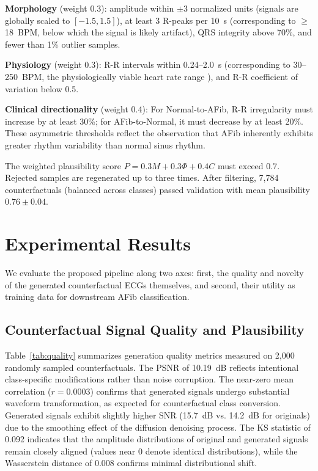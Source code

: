 \documentclass[conference]{IEEEtran}
\begin{document}
\textbf{Morphology} (weight 0.3): amplitude within $\pm 3$ normalized units (signals are globally scaled to $[-1.5, 1.5]$), at least 3 R-peaks per 10~s (corresponding to $\geq$18~BPM, below which the signal is likely artifact), QRS integrity above 70\%, and fewer than 1\% outlier samples.

\textbf{Physiology} (weight 0.3): R-R intervals within 0.24--2.0~s (corresponding to 30--250~BPM, the physiologically viable heart rate range \cite{clifford2006}), and R-R coefficient of variation below 0.5.

\textbf{Clinical directionality} (weight 0.4): For Normal-to-AFib, R-R irregularity must increase by at least 30\%; for AFib-to-Normal, it must decrease by at least 20\%. These asymmetric thresholds reflect the observation that AFib inherently exhibits greater rhythm variability than normal sinus rhythm.

The weighted plausibility score $P = 0.3 M + 0.3 \Phi + 0.4 C$ must exceed 0.7. Rejected samples are regenerated up to three times. After filtering, 7,784 counterfactuals (balanced across classes) passed validation with mean plausibility $0.76 \pm 0.04$.


\section{Experimental Results}

We evaluate the proposed pipeline along two axes: first, the quality and novelty of the generated counterfactual ECGs themselves, and second, their utility as training data for downstream AFib classification.

\subsection{Counterfactual Signal Quality and Plausibility}

Table~\ref{tab:quality} summarizes generation quality metrics measured on 2,000 randomly sampled counterfactuals. The PSNR of 10.19~dB reflects intentional class-specific modifications rather than noise corruption. The near-zero mean correlation ($r{=}0.0003$) confirms that generated signals undergo substantial waveform transformation, as expected for counterfactual class conversion. Generated signals exhibit slightly higher SNR (15.7~dB vs. 14.2~dB for originals) due to the smoothing effect of the diffusion denoising process. The KS statistic of 0.092 indicates that the amplitude distributions of original and generated signals remain closely aligned (values near 0 denote identical distributions), while the Wasserstein distance of 0.008 confirms minimal distributional shift.
\end{document}
